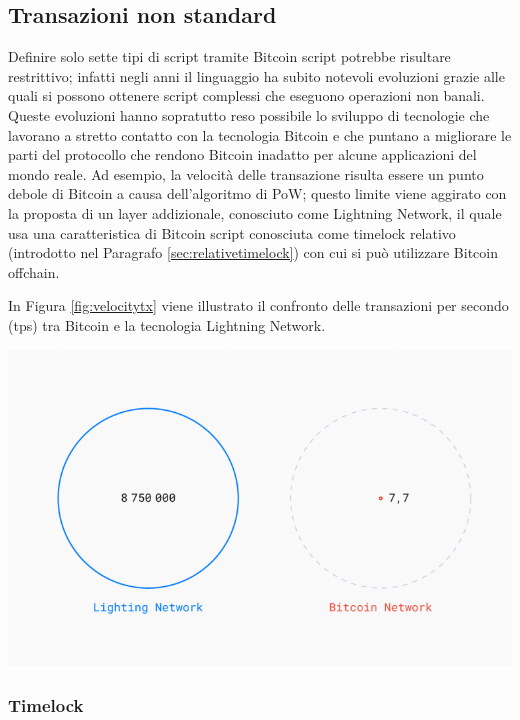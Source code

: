 \subsection{Transazioni non standard}
Definire solo sette tipi di script tramite Bitcoin script potrebbe risultare restrittivo; infatti negli anni il linguaggio ha subito notevoli evoluzioni grazie alle quali si possono ottenere script complessi che eseguono operazioni non banali. Queste evoluzioni hanno sopratutto reso possibile lo sviluppo di tecnologie che lavorano a stretto contatto con la tecnologia Bitcoin e che puntano a migliorare le parti del protocollo che rendono Bitcoin inadatto per alcune applicazioni del mondo reale. Ad esempio, la velocità delle transazione risulta essere un punto debole di Bitcoin a causa dell’algoritmo di PoW; questo limite viene aggirato con la proposta di un layer addizionale, conosciuto come Lightning Network, il quale usa una caratteristica di Bitcoin script conosciuta come timelock relativo (introdotto nel Paragrafo \ref{sec:relativetimelock}) con cui si può utilizzare Bitcoin offchain.

In Figura \ref{fig:velocitytx} viene illustrato il confronto delle transazioni per secondo (tps) tra Bitcoin e la tecnologia Lightning Network.

{\centering
\includegraphics[scale=0.35]{images/Lightning-Network-study.png}
\par}

\subsubsection{Timelock}

